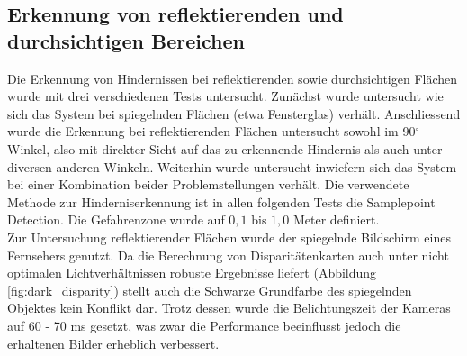 \subsection{Erkennung von reflektierenden und durchsichtigen Bereichen}
\label{subsec:test_reflection_translucency}

Die Erkennung von Hindernissen bei reflektierenden sowie durchsichtigen Flächen wurde mit drei verschiedenen Tests untersucht. Zunächst wurde untersucht wie sich das System bei spiegelnden Flächen (etwa Fensterglas) verhält. Anschliessend wurde die Erkennung bei reflektierenden Flächen untersucht sowohl im 90$^\circ$ Winkel, also mit direkter Sicht auf das zu erkennende Hindernis als auch unter diversen anderen Winkeln. Weiterhin wurde untersucht inwiefern sich das System bei einer Kombination beider Problemstellungen verhält. Die verwendete Methode zur Hinderniserkennung ist in allen folgenden Tests die Samplepoint Detection. Die Gefahrenzone wurde auf $0,1$ bis $1,0$ Meter definiert.\\

\noindent
Zur Untersuchung reflektierender Flächen wurde der spiegelnde Bildschirm eines Fernsehers genutzt. Da die Berechnung von Disparitätenkarten auch unter nicht optimalen Lichtverhältnissen robuste Ergebnisse liefert (Abbildung \ref{fig:dark_disparity}) stellt auch die Schwarze Grundfarbe des spiegelnden Objektes kein Konflikt dar. Trotz dessen wurde die Belichtungszeit der Kameras auf 60 - 70 ms gesetzt, was zwar die Performance beeinflusst jedoch die erhaltenen Bilder erheblich verbessert.\\

